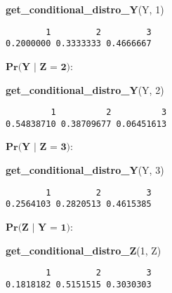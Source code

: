 \documentclass[
]{article}
\newenvironment{Shaded}{\begin{snugshade}}{\end{snugshade}}
\newcommand{\DecValTok}[1]{\textcolor[rgb]{0.00,0.00,0.81}{#1}}
\newcommand{\FunctionTok}[1]{\textcolor[rgb]{0.13,0.29,0.53}{\textbf{#1}}}
\newcommand{\NormalTok}[1]{#1}
\begin{document}
\begin{Shaded}
\begin{Highlighting}[]
\FunctionTok{get\_conditional\_distro\_Y}\NormalTok{(Y, }\DecValTok{1}\NormalTok{)}
\end{Highlighting}
\end{Shaded}

\begin{verbatim}
        1         2         3 
0.2000000 0.3333333 0.4666667 
\end{verbatim}

\vspace{0.5cm}

\(\textbf{Pr(Y | Z = 2)}\):

\begin{Shaded}
\begin{Highlighting}[]
\FunctionTok{get\_conditional\_distro\_Y}\NormalTok{(Y, }\DecValTok{2}\NormalTok{)}
\end{Highlighting}
\end{Shaded}

\begin{verbatim}
         1          2          3 
0.54838710 0.38709677 0.06451613 
\end{verbatim}

\vspace{0.5cm}

\(\textbf{Pr(Y | Z = 3)}\):

\begin{Shaded}
\begin{Highlighting}[]
\FunctionTok{get\_conditional\_distro\_Y}\NormalTok{(Y, }\DecValTok{3}\NormalTok{)}
\end{Highlighting}
\end{Shaded}

\begin{verbatim}
        1         2         3 
0.2564103 0.2820513 0.4615385 
\end{verbatim}

\vspace{0.5cm}

\(\textbf{Pr(Z | Y = 1)}\):

\begin{Shaded}
\begin{Highlighting}[]
\FunctionTok{get\_conditional\_distro\_Z}\NormalTok{(}\DecValTok{1}\NormalTok{, Z)}
\end{Highlighting}
\end{Shaded}

\begin{verbatim}
        1         2         3 
0.1818182 0.5151515 0.3030303 
\end{verbatim}
\end{document}
